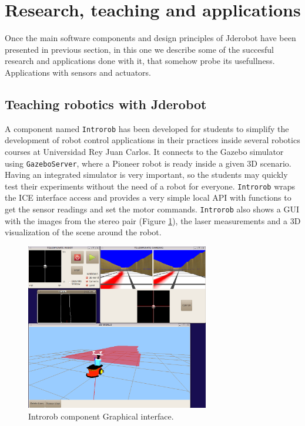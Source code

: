 \documentclass[twocolumn]{svjour3}          %
\begin{document}
\section{Research, teaching and applications}
\label{sec:applications}

Once the main software components and design principles of Jderobot have been presented in previous section, in this one we describe some of the succesful research and applications done with it, that somehow probe its usefullness. Applications with sensors and actuators.

\subsection{Teaching robotics with Jderobot}

A component named \texttt{Introrob} has been developed for students to simplify the development of robot control applications in their practices inside several robotics courses at Universidad Rey Juan Carlos. It connects to the Gazebo simulator using \texttt{GazeboServer}, where a Pioneer robot is ready inside a given 3D scenario. Having an integrated simulator is very important, so the students may quickly test their experiments without the need of a robot for everyone. \texttt{Introrob} wraps the ICE interface access and provides a very simple local API with functions to get the sensor readings and set the motor commands. \texttt{Introrob} also shows a GUI with the images from the stereo pair (Figure \ref{fig:introrob}), the laser measurements and a 3D visualization of the scene around the robot. 

\begin{figure}[h!]
  \includegraphics[width=8cm]{introrob.png}
\caption{Introrob component Graphical interface.}
\label{fig:introrob}
\end{figure}
\end{document}
